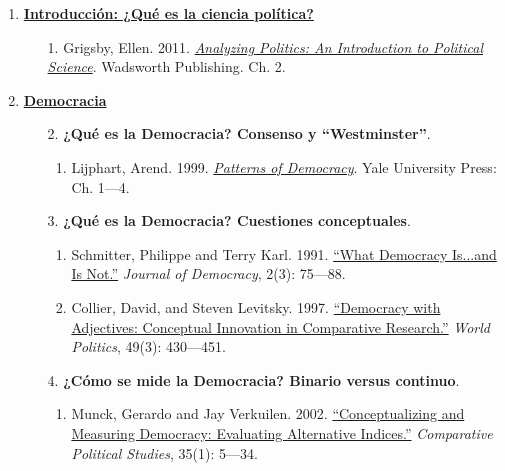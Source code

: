 \documentclass[letterpaper]{article}
\begin{document}
\begin{enumerate}
		\item {\bf \underline{Introducci\'on: ¿Qu\'e es la ciencia pol\'itica?}}
			\begin{enumerate}
				\item[1.] Grigsby, Ellen. 2011. \href{https://github.com/hbahamonde/Ciencia_Politica_I/raw/master/Readings/Grigsby.pdf}{\emph{Analyzing Politics: An Introduction to Political Science}}. Wadsworth Publishing. Ch. 2.
			\end{enumerate}
		\item {\bf \underline{Democracia}}
			\begin{enumerate}
			
				\item[2.] {\bf ¿Qu\'e es la Democracia? Consenso y ``Westminster''}.
					\begin{enumerate}
						\item Lijphart, Arend. 1999. \href{https://github.com/hbahamonde/Ciencia_Politica_I/raw/master/Readings/Lijphart.pdf}{\emph{Patterns of Democracy}}. Yale University Press: Ch. 1---4.
					\end{enumerate}
			
				\item[3.] {\bf ¿Qu\'e es la Democracia? Cuestiones conceptuales}.
					\begin{enumerate}
					 \item Schmitter, Philippe and Terry Karl. 1991. \href{https://github.com/hbahamonde/Ciencia_Politica_I/raw/master/Readings/Schmitter_Karl.pdf}{``What Democracy Is...and Is Not.''} \emph{Journal of Democracy}, 2(3): 75---88.
					 
					 \item Collier, David, and Steven Levitsky. 1997. \href{https://github.com/hbahamonde/Ciencia_Politica_I/raw/master/Readings/Collier_Levitsky.pdf}{``Democracy with Adjectives: Conceptual Innovation in Comparative Research.''} \emph{World Politics}, 49(3): 430---451. 
					\end{enumerate}
			
				\item[4.] {\bf ¿C\'omo se mide la Democracia? Binario versus continuo}.
					\begin{enumerate}
						\item Munck, Gerardo and Jay Verkuilen. 2002. \href{https://github.com/hbahamonde/Ciencia_Politica_I/raw/master/Readings/Munck_Verkuilen.pdf}{``Conceptualizing and Measuring Democracy: Evaluating Alternative Indices.''} \emph{Comparative Political Studies}, 35(1): 5---34.%
						

\end{enumerate}
\end{enumerate}
\end{enumerate}
\end{document}
